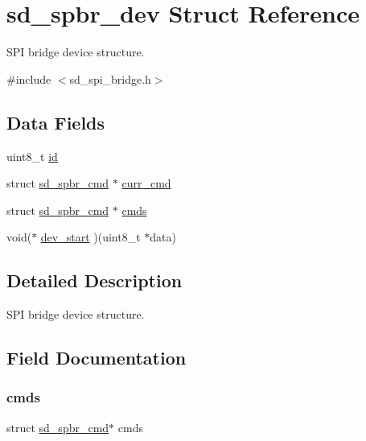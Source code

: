 \hypertarget{structsd__spbr__dev}{}\section{sd\+\_\+spbr\+\_\+dev Struct Reference}
\label{structsd__spbr__dev}


S\+PI bridge device structure.  




{\ttfamily \#include $<$sd\+\_\+spi\+\_\+bridge.\+h$>$}

\subsection*{Data Fields}
\begin{DoxyCompactItemize}
\item 
uint8\+\_\+t \mbox{\hyperlink{structsd__spbr__dev_a1e6927fa1486224044e568f9c370519b}{id}}
\item 
struct \mbox{\hyperlink{structsd__spbr__cmd}{sd\+\_\+spbr\+\_\+cmd}} $\ast$ \mbox{\hyperlink{structsd__spbr__dev_a3217f31b08eb084b2c943abd2af5ca8b}{curr\+\_\+cmd}}
\item 
struct \mbox{\hyperlink{structsd__spbr__cmd}{sd\+\_\+spbr\+\_\+cmd}} $\ast$ \mbox{\hyperlink{structsd__spbr__dev_acf35c83b2010d52c70fcc6b3db393bc6}{cmds}}
\item 
void($\ast$ \mbox{\hyperlink{structsd__spbr__dev_a3e035473248af7cdffca805f540617c8}{dev\+\_\+start}} )(uint8\+\_\+t $\ast$data)
\end{DoxyCompactItemize}


\subsection{Detailed Description}
S\+PI bridge device structure. 

\subsection{Field Documentation}
\mbox{\label{structsd__spbr__dev_acf35c83b2010d52c70fcc6b3db393bc6}} 
\subsubsection{\texorpdfstring{cmds}{cmds}}
{\footnotesize\ttfamily struct \mbox{\hyperlink{structsd__spbr__cmd}{sd\+\_\+spbr\+\_\+cmd}}$\ast$ cmds}

